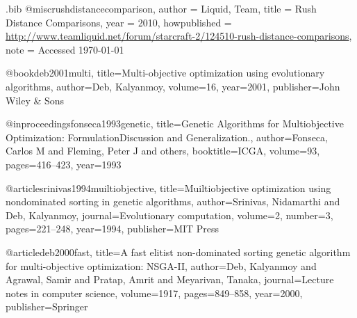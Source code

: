 \begin{filecontents*}{\jobname.bib}
@misc{rushdistancecomparison,
	author 	= {Liquid, Team},
	title 		= {Rush Distance Comparisons},
	year 		= {2010},
	howpublished = {\url{http://www.teamliquid.net/forum/starcraft-2/124510-rush-distance-comparisons}},
	note  		= {Accessed \today}
}

@book{deb2001multi,
  title={Multi-objective optimization using evolutionary algorithms},
  author={Deb, Kalyanmoy},
  volume={16},
  year={2001},
  publisher={John Wiley \& Sons}
}

@inproceedings{fonseca1993genetic,
  title={Genetic Algorithms for Multiobjective Optimization: FormulationDiscussion and Generalization.},
  author={Fonseca, Carlos M and Fleming, Peter J and others},
  booktitle={ICGA},
  volume={93},
  pages={416--423},
  year={1993}
}

@article{srinivas1994muiltiobjective,
  title={Muiltiobjective optimization using nondominated sorting in genetic algorithms},
  author={Srinivas, Nidamarthi and Deb, Kalyanmoy},
  journal={Evolutionary computation},
  volume={2},
  number={3},
  pages={221--248},
  year={1994},
  publisher={MIT Press}
}

@article{deb2000fast,
  title={A fast elitist non-dominated sorting genetic algorithm for multi-objective optimization: NSGA-II},
  author={Deb, Kalyanmoy and Agrawal, Samir and Pratap, Amrit and Meyarivan, Tanaka},
  journal={Lecture notes in computer science},
  volume={1917},
  pages={849--858},
  year={2000},
  publisher={Springer}
}


\end{filecontents*}


